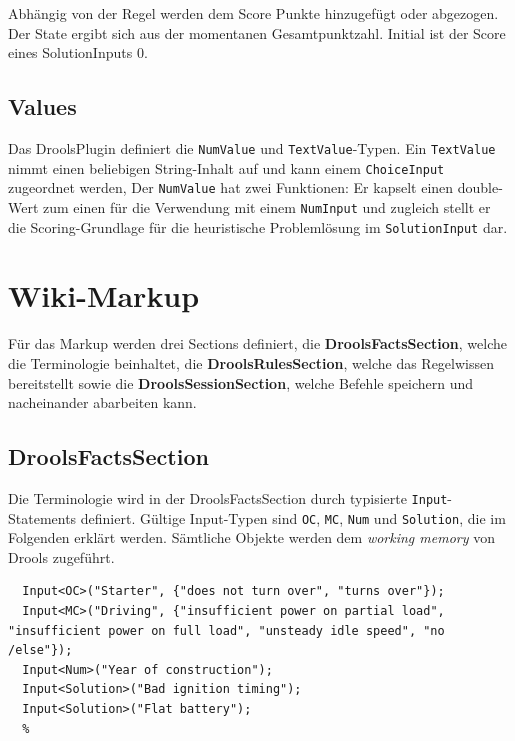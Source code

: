 \documentclass[a4paper,12pt]{report}
\begin{document}
Abhängig von der Regel werden dem Score Punkte hinzugefügt oder abgezogen. Der State ergibt sich aus der momentanen Gesamtpunktzahl. Initial ist der Score eines
SolutionInputs 0.

  \subsection{Values}

Das DroolsPlugin definiert die \texttt{NumValue} und \texttt{TextValue}-Typen.
Ein \texttt{TextValue} nimmt einen beliebigen String-Inhalt auf und kann einem \texttt{ChoiceInput} zugeordnet werden,
Der \texttt{NumValue} hat zwei Funktionen: Er kapselt einen double-Wert zum einen für die Verwendung 
mit einem \texttt{NumInput} und zugleich stellt er die Scoring-Grundlage für die 
heuristische Problemlösung im \texttt{SolutionInput} dar.
  
  \section{Wiki-Markup}
  
Für das Markup werden drei Sections definiert, die \textbf{DroolsFactsSection}, welche die Terminologie beinhaltet, 
die \textbf{DroolsRulesSection}, welche das Regelwissen bereitstellt sowie die \textbf{DroolsSessionSection}, welche 
Befehle speichern und nacheinander abarbeiten kann.
  
  \subsection{DroolsFactsSection}
  
  Die Terminologie wird in der DroolsFactsSection durch typisierte \texttt{Input}-Statements definiert.
  Gültige Input-Typen sind \texttt{OC}, \texttt{MC}, \texttt{Num} und \texttt{Solution}, die im Folgenden erklärt werden.
  Sämtliche Objekte werden dem \emph{working memory} von Drools zugeführt.
  
  \lstset{numbers=left, numberstyle=\tiny, basicstyle=\small\ttfamily, stepnumber=1, numbersep=5pt, language=droolsfacts, breaklines=true, breakatwhitespace=true}
  \begin{lstlisting}[caption=Beispiel DroolsFactsSection]
  %%DroolsFacts
  Input<OC>("Starter", {"does not turn over", "turns over"});
  Input<MC>("Driving", {"insufficient power on partial load", "insufficient power on full load", "unsteady idle speed", "no /else"});
  Input<Num>("Year of construction");
  Input<Solution>("Bad ignition timing");
  Input<Solution>("Flat battery");
  %    
  \end{lstlisting}
  
\end{document}
